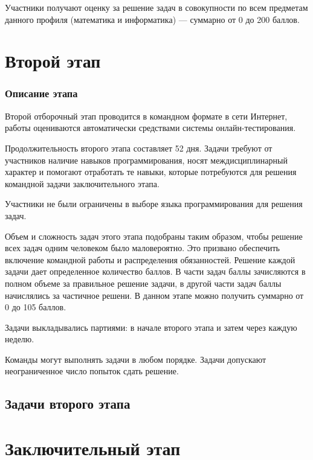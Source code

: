 \documentclass[a4paper,12pt,oneside]{book}
\begin{document}
Участники получают оценку за решение задач в совокупности по всем предметам данного профиля (математика и информатика) --- суммарно от 0 до 200 баллов.
  


 
\part{Второй этап}
\newpage

\section*{Описание этапа}

Второй отборочный этап проводится в командном формате в сети Интернет, работы оцениваются автоматически средствами системы онлайн-тестирования.

Продолжительность второго этапа составляет 52 дня. Задачи требуют от участников наличие навыков программирования, носят междисциплинарный характер и помогают отработать те навыки, которые потребуются для решения командной задачи заключительного этапа.

Участники не были ограничены в выборе языка программирования для решения задач.

Объем и сложность задач этого этапа подобраны таким образом, чтобы решение всех задач одним человеком было маловероятно. Это призвано обеспечить включение командной работы и распределения обязанностей. Решение каждой задачи дает определенное количество баллов. В части задач баллы зачисляются в полном объеме за правильное решение задачи, в другой части задач баллы начислялись за частичное решени. В данном этапе можно получить суммарно от 0 до 105 баллов.

Задачи выкладывались партиями: в начале второго этапа и затем через каждую неделю.

Команды могут выполнять задачи в любом порядке. Задачи допускают неограниченное число попыток сдать решение.


\clearpage
\chapter{Задачи второго этапа}


\part{Заключительный этап}
 
\end{document}
